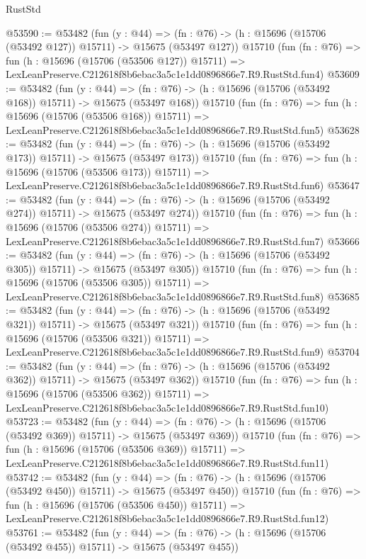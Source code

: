 \begin{lexlean}{RustStd}
\begin{coremodule}
@53590 := @53482
    (fun (y : @44) =>
    (fn : @76) -> (h : @15696 (@15706 (@53492 @127)) @15711) -> @15675 (@53497 @127))
    @15710
    (fun (fn : @76) =>
    fun (h : @15696 (@15706 (@53506 @127)) @15711) =>
    LexLeanPreserve.C212618f8b6ebac3a5c1e1dd0896866e7.R9.RustStd.fun4)
@53609 := @53482
    (fun (y : @44) =>
    (fn : @76) -> (h : @15696 (@15706 (@53492 @168)) @15711) -> @15675 (@53497 @168))
    @15710
    (fun (fn : @76) =>
    fun (h : @15696 (@15706 (@53506 @168)) @15711) =>
    LexLeanPreserve.C212618f8b6ebac3a5c1e1dd0896866e7.R9.RustStd.fun5)
@53628 := @53482
    (fun (y : @44) =>
    (fn : @76) -> (h : @15696 (@15706 (@53492 @173)) @15711) -> @15675 (@53497 @173))
    @15710
    (fun (fn : @76) =>
    fun (h : @15696 (@15706 (@53506 @173)) @15711) =>
    LexLeanPreserve.C212618f8b6ebac3a5c1e1dd0896866e7.R9.RustStd.fun6)
@53647 := @53482
    (fun (y : @44) =>
    (fn : @76) -> (h : @15696 (@15706 (@53492 @274)) @15711) -> @15675 (@53497 @274))
    @15710
    (fun (fn : @76) =>
    fun (h : @15696 (@15706 (@53506 @274)) @15711) =>
    LexLeanPreserve.C212618f8b6ebac3a5c1e1dd0896866e7.R9.RustStd.fun7)
@53666 := @53482
    (fun (y : @44) =>
    (fn : @76) -> (h : @15696 (@15706 (@53492 @305)) @15711) -> @15675 (@53497 @305))
    @15710
    (fun (fn : @76) =>
    fun (h : @15696 (@15706 (@53506 @305)) @15711) =>
    LexLeanPreserve.C212618f8b6ebac3a5c1e1dd0896866e7.R9.RustStd.fun8)
@53685 := @53482
    (fun (y : @44) =>
    (fn : @76) -> (h : @15696 (@15706 (@53492 @321)) @15711) -> @15675 (@53497 @321))
    @15710
    (fun (fn : @76) =>
    fun (h : @15696 (@15706 (@53506 @321)) @15711) =>
    LexLeanPreserve.C212618f8b6ebac3a5c1e1dd0896866e7.R9.RustStd.fun9)
@53704 := @53482
    (fun (y : @44) =>
    (fn : @76) -> (h : @15696 (@15706 (@53492 @362)) @15711) -> @15675 (@53497 @362))
    @15710
    (fun (fn : @76) =>
    fun (h : @15696 (@15706 (@53506 @362)) @15711) =>
    LexLeanPreserve.C212618f8b6ebac3a5c1e1dd0896866e7.R9.RustStd.fun10)
@53723 := @53482
    (fun (y : @44) =>
    (fn : @76) -> (h : @15696 (@15706 (@53492 @369)) @15711) -> @15675 (@53497 @369))
    @15710
    (fun (fn : @76) =>
    fun (h : @15696 (@15706 (@53506 @369)) @15711) =>
    LexLeanPreserve.C212618f8b6ebac3a5c1e1dd0896866e7.R9.RustStd.fun11)
@53742 := @53482
    (fun (y : @44) =>
    (fn : @76) -> (h : @15696 (@15706 (@53492 @450)) @15711) -> @15675 (@53497 @450))
    @15710
    (fun (fn : @76) =>
    fun (h : @15696 (@15706 (@53506 @450)) @15711) =>
    LexLeanPreserve.C212618f8b6ebac3a5c1e1dd0896866e7.R9.RustStd.fun12)
@53761 := @53482
    (fun (y : @44) =>
    (fn : @76) -> (h : @15696 (@15706 (@53492 @455)) @15711) -> @15675 (@53497 @455))

\end{coremodule}
\end{lexlean}
